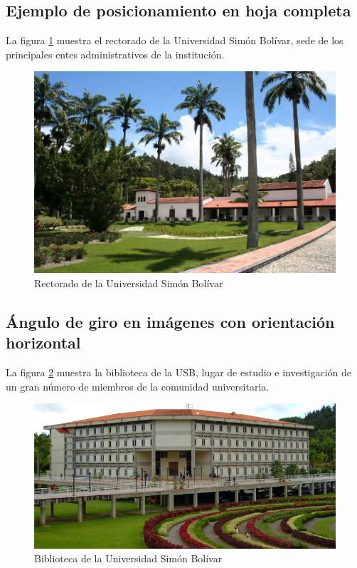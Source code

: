\subsection{Ejemplo de posicionamiento en hoja completa}

La figura \ref{fig:rectorado} muestra el rectorado de la Universidad Simón Bolívar, sede de los principales entes administrativos de la institución.

\begin{figure}[p]
\centering
\includegraphics[width=1.0\textwidth]{2_MainMatter/Capitulo1/Imagenes/rectorado.jpg}
\caption{Rectorado de la Universidad Simón Bolívar}
\label{fig:rectorado}
\end{figure}

\subsection{Ángulo de giro en imágenes con orientación horizontal}

La figura \ref{fig:biblioteca} muestra la biblioteca de la USB, lugar de estudio e investigación de un gran número de miembros de la comunidad universitaria.

\begin{figure}[p]
\centering
\includegraphics[width=1.3\textwidth, angle=90]{2_MainMatter/Capitulo1/Imagenes/biblioteca.jpg}
\caption{Biblioteca de la Universidad Simón Bolívar}
\label{fig:biblioteca}
\end{figure}

